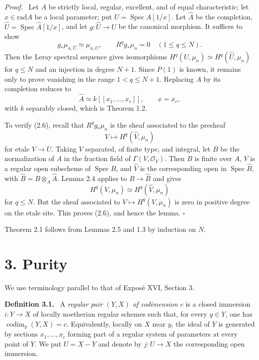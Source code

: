 \documentclass[12pt]{article}
\newcommand{\Oo}{\mathcal O}
\DeclareMathOperator{\Spec}{Spec}
\DeclareMathOperator{\codim}{codim}
\newcommand{\rad}{\mathrm{rad}}
\newcommand{\qedtext}{\hfill\(\square\)}
\newenvironment{statement}[1]{\par\medskip\noindent\textbf{#1.}\ }{\par\medskip}
\newenvironment{prooftext}[1][Proof]{\par\noindent\emph{#1.}\ }{\par\medskip}
\begin{document}
\begin{prooftext}
Let $A$ be strictly local, regular, excellent, and of equal characteristic; let $x\in\rad A$ be a local parameter; put $U=\Spec A[1/x]$. Let $\widehat A$ be the completion, $\widehat U=\Spec\widehat A[1/x]$, and let $g:\widehat U\to U$ be the canonical morphism. It suffices to show
\begin{equation}
   g_*\mu_{n,\widehat U}\simeq \mu_{n,U},\qquad
   R^qg_*\mu_n=0\quad (1\le q\le N). \tag{2.6}
\end{equation}
Then the Leray spectral sequence gives isomorphisms $H^q(U,\mu_n)\simeq H^q(\widehat U,\mu_n)$ for $q\leq N$ and an injection in degree $N+1$. Since $P(1)$ is known, it remains only to prove vanishing in the range $1<q\leq N+1$. Replacing $A$ by its completion reduces to
\[
   \widehat A\simeq k[[x_1,\ldots,x_r]],\qquad x=x_r,
\]
with $k$ separably closed, which is Theorem 1.2.

To verify (2.6), recall that $R^qg_*\mu_n$ is the sheaf associated to the presheaf
\[
   V\longmapsto H^q(\widehat V,\mu_n)
\]
for etale $V\to U$. Taking $V$ separated, of finite type, and integral, let $B$ be the normalization of $A$ in the fraction field of $\Gamma(V,\Oo_V)$. Then $B$ is finite over $A$, $V$ is a regular open subscheme of $\Spec B$, and $\widehat V$ is the corresponding open in $\Spec\widehat B$, with $\widehat B=B\otimes_A\widehat A$. Lemma 2.4 applies to $B\to\widehat B$ and gives
\[
   H^q(V,\mu_n)\simeq H^q(\widehat V,\mu_n)
\]
for $q\leq N$. But the sheaf associated to $V\mapsto H^q(V,\mu_n)$ is zero in positive degree on the etale site. This proves (2.6), and hence the lemma. \qedtext
\end{prooftext}

Theorem 2.1 follows from Lemmas 2.5 and 1.3 by induction on $N$.

\section*{3. Purity}

We use terminology parallel to that of Expos\'e XVI, Section 3.

\begin{statement}{Definition 3.1}
A \emph{regular pair $(Y,X)$ of codimension $c$} is a closed immersion $i:Y\to X$ of locally noetherian regular schemes such that, for every $y\in Y$, one has $\codim_y(Y,X)=c$. Equivalently, locally on $X$ near $y$, the ideal of $Y$ is generated by sections $x_1,\ldots,x_c$ forming part of a regular system of parameters at every point of $Y$. We put $U=X-Y$ and denote by $j:U\to X$ the corresponding open immersion.
\end{statement}
\end{document}

